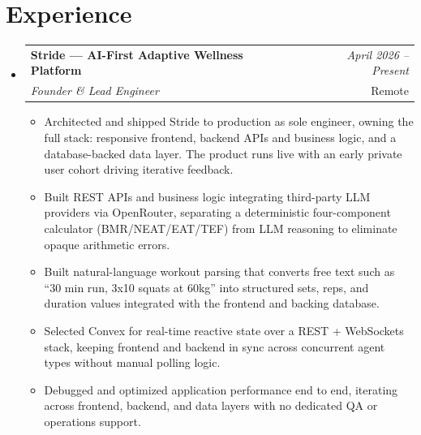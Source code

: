 \documentclass[a4paper,11pt]{article}
\makeatletter
\newcommand{\resumeSubheading}[4]{
\vspace{0.5mm}\item
    \begin{tabular*}{0.98\textwidth}[t]{l@{\extracolsep{\fill}}r}
        \textbf{#1} & \textit{\footnotesize{#4}} \\
        \textit{\footnotesize{#3}} & \footnotesize{#2}\\
    \end{tabular*}
    \vspace{-2.4mm}
}
\newcommand{\resumeSubHeadingListStart}{\begin{itemize}[leftmargin=*,labelsep=0mm]}
\newcommand{\resumeItemListStart}{\begin{justify}\begin{itemize}[leftmargin=3ex, rightmargin=2ex, noitemsep,labelsep=1.2mm,itemsep=0mm]\small}
\newcommand{\resumeSubHeadingListEnd}{\end{itemize}\vspace{2mm}}
\newcommand{\resumeItemListEnd}{\end{itemize}\end{justify}\vspace{-2mm}}
\makeatother
\begin{document}
\section{\textbf{Experience}}
\resumeSubHeadingListStart
    \resumeSubheading
      {Stride --- AI-First Adaptive Wellness Platform}{Remote}
      {Founder \& Lead Engineer}{April 2026 -- Present}
      \resumeItemListStart
        \item {Architected and shipped Stride to production as sole engineer, owning the full stack: responsive frontend, backend APIs and business logic, and a database-backed data layer. The product runs live with an early private user cohort driving iterative feedback.}
        \item {Built REST APIs and business logic integrating third-party LLM providers via OpenRouter, separating a deterministic four-component calculator (BMR/NEAT/EAT/TEF) from LLM reasoning to eliminate opaque arithmetic errors.}
        \item {Built natural-language workout parsing that converts free text such as ``30 min run, 3x10 squats at 60kg'' into structured sets, reps, and duration values integrated with the frontend and backing database.}
        \item {Selected Convex for real-time reactive state over a REST + WebSockets stack, keeping frontend and backend in sync across concurrent agent types without manual polling logic.}
        \item {Debugged and optimized application performance end to end, iterating across frontend, backend, and data layers with no dedicated QA or operations support.}
      \resumeItemListEnd
\resumeSubHeadingListEnd
\vspace{-5mm}

\end{document}
